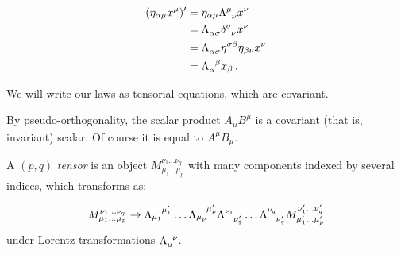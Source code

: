 \documentclass[main.tex]{subfiles}
\begin{document}
\begin{subequations}
\begin{align}
  (\eta_{\alpha\mu} x^\mu)' &=  \eta_{\alpha \mu} \tensor{\Lambda}{^\mu_\nu}x^\nu  \\
  &= \tensor{\Lambda}{_\alpha_\sigma} \tensor{\delta}{^\sigma_\nu} x^\nu  \\
  &= \tensor{\Lambda}{_\alpha_\sigma} \eta^{\sigma \beta} \eta_{\beta \nu} x^\nu  \\
  &= \tensor{\Lambda}{_\alpha^\beta} x_\beta\,.
\end{align}
\end{subequations}

We will write our laws as tensorial equations, which are covariant.

By pseudo-orthogonality, the scalar product \(A_\mu B^\mu\) is a covariant (that is, invariant) scalar. Of course it is equal to \(A^\mu B_\mu\).

\begin{definition}[Tensor]
    A \((p, q)\) \emph{tensor} is an object \(M_{\mu_1 \dots \mu_p}^{\nu_1 \dots \nu_q}\) with many components indexed by several indices, which transforms as:

    \begin{equation}
        M_{\mu_1 \dots \mu_p}^{\nu_1 \dots \nu_q}
        \rightarrow
        \tensor{\Lambda}{_{\mu_1}^{\mu'_1}}\dots
        \tensor{\Lambda}{_{\mu_p}^{\mu'_p}}
        \tensor{\Lambda}{^{\nu_1}_{\nu'_1}}\dots
        \tensor{\Lambda}{^{\nu_q}_{\nu'_q}}
        M_{\mu_1' \dots \mu_p'}^{\nu_1' \dots \nu_q'}
    \end{equation}
    under Lorentz transformations \(\tensor{\Lambda}{_\mu^\nu}\).
\end{definition}
\end{document}
